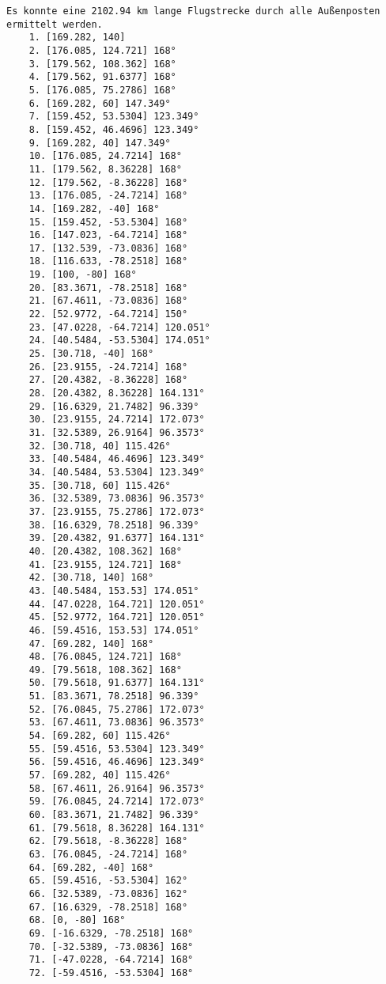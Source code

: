 \documentclass[a4paper,10pt,ngerman]{scrartcl}
\begin{document}
    \begin{lstlisting}[frame=single, title=Programmausgabe wenigerkrumm3.txt, breaklines=true,label={lst:lstlisting4}]
    Es konnte eine 2102.94 km lange Flugstrecke durch alle Außenposten ermittelt werden.
    1. [169.282, 140]
    2. [176.085, 124.721] 168°
    3. [179.562, 108.362] 168°
    4. [179.562, 91.6377] 168°
    5. [176.085, 75.2786] 168°
    6. [169.282, 60] 147.349°
    7. [159.452, 53.5304] 123.349°
    8. [159.452, 46.4696] 123.349°
    9. [169.282, 40] 147.349°
    10. [176.085, 24.7214] 168°
    11. [179.562, 8.36228] 168°
    12. [179.562, -8.36228] 168°
    13. [176.085, -24.7214] 168°
    14. [169.282, -40] 168°
    15. [159.452, -53.5304] 168°
    16. [147.023, -64.7214] 168°
    17. [132.539, -73.0836] 168°
    18. [116.633, -78.2518] 168°
    19. [100, -80] 168°
    20. [83.3671, -78.2518] 168°
    21. [67.4611, -73.0836] 168°
    22. [52.9772, -64.7214] 150°
    23. [47.0228, -64.7214] 120.051°
    24. [40.5484, -53.5304] 174.051°
    25. [30.718, -40] 168°
    26. [23.9155, -24.7214] 168°
    27. [20.4382, -8.36228] 168°
    28. [20.4382, 8.36228] 164.131°
    29. [16.6329, 21.7482] 96.339°
    30. [23.9155, 24.7214] 172.073°
    31. [32.5389, 26.9164] 96.3573°
    32. [30.718, 40] 115.426°
    33. [40.5484, 46.4696] 123.349°
    34. [40.5484, 53.5304] 123.349°
    35. [30.718, 60] 115.426°
    36. [32.5389, 73.0836] 96.3573°
    37. [23.9155, 75.2786] 172.073°
    38. [16.6329, 78.2518] 96.339°
    39. [20.4382, 91.6377] 164.131°
    40. [20.4382, 108.362] 168°
    41. [23.9155, 124.721] 168°
    42. [30.718, 140] 168°
    43. [40.5484, 153.53] 174.051°
    44. [47.0228, 164.721] 120.051°
    45. [52.9772, 164.721] 120.051°
    46. [59.4516, 153.53] 174.051°
    47. [69.282, 140] 168°
    48. [76.0845, 124.721] 168°
    49. [79.5618, 108.362] 168°
    50. [79.5618, 91.6377] 164.131°
    51. [83.3671, 78.2518] 96.339°
    52. [76.0845, 75.2786] 172.073°
    53. [67.4611, 73.0836] 96.3573°
    54. [69.282, 60] 115.426°
    55. [59.4516, 53.5304] 123.349°
    56. [59.4516, 46.4696] 123.349°
    57. [69.282, 40] 115.426°
    58. [67.4611, 26.9164] 96.3573°
    59. [76.0845, 24.7214] 172.073°
    60. [83.3671, 21.7482] 96.339°
    61. [79.5618, 8.36228] 164.131°
    62. [79.5618, -8.36228] 168°
    63. [76.0845, -24.7214] 168°
    64. [69.282, -40] 168°
    65. [59.4516, -53.5304] 162°
    66. [32.5389, -73.0836] 162°
    67. [16.6329, -78.2518] 168°
    68. [0, -80] 168°
    69. [-16.6329, -78.2518] 168°
    70. [-32.5389, -73.0836] 168°
    71. [-47.0228, -64.7214] 168°
    72. [-59.4516, -53.5304] 168°

\end{lstlisting}
\end{document}
